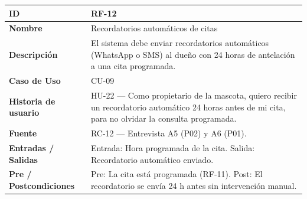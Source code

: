 \documentclass[
]{article}
\newcounter{none} %
\begin{document}
{\def\LTcaptype{none} %
\begin{longtable}[]{|
  >{\raggedright\arraybackslash}p{}|
  >{\raggedright\arraybackslash}p{}|}
\hline
\begin{minipage}[b]{\linewidth}\raggedright
\textbf{ID}
\end{minipage} & \begin{minipage}[b]{\linewidth}\raggedright
RF-12
\end{minipage} \\
\hline
\endhead
\hline
\endlastfoot
\textbf{Nombre} & \begin{minipage}[t]{\linewidth}\raggedright
Recordatorios automáticos de citas
\end{minipage} \\
\hline
\textbf{Descripción} & \begin{minipage}[t]{\linewidth}\raggedright
El sistema debe enviar recordatorios automáticos (WhatsApp o SMS) al dueño con 24 horas de antelación a una cita programada.
\end{minipage} \\
\hline
\textbf{Caso de Uso} & \begin{minipage}[t]{\linewidth}\raggedright
CU-09
\end{minipage} \\
\hline
\textbf{Historia de usuario} & \begin{minipage}[t]{\linewidth}\raggedright
HU-22 — Como propietario de la mascota, quiero recibir un recordatorio automático 24 horas antes de mi cita, para no olvidar la consulta programada.
\end{minipage} \\
\hline
\textbf{Fuente} & \begin{minipage}[t]{\linewidth}\raggedright
RC-12 — Entrevista A5 (P02) y A6 (P01).
\end{minipage} \\
\hline
\textbf{Entradas / Salidas} & \begin{minipage}[t]{\linewidth}\raggedright
Entrada: Hora programada de la cita. Salida: Recordatorio automático enviado.
\end{minipage} \\
\hline
\textbf{Pre / Postcondiciones} & \begin{minipage}[t]{\linewidth}\raggedright
Pre: La cita está programada (RF-11). Post: El recordatorio se envía 24 h antes sin intervención manual.
\end{minipage} \\

\end{longtable}}
\end{document}
